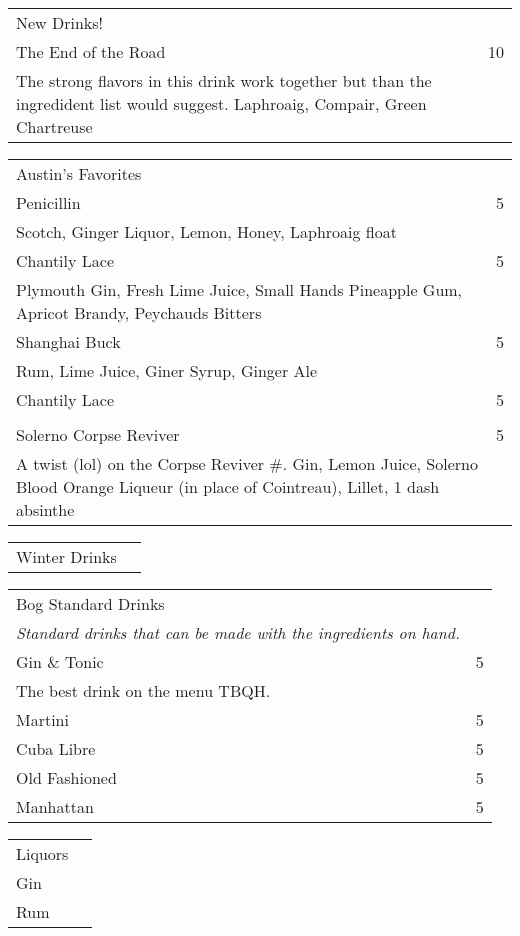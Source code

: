 \documentclass[12pt]{article}
\makeatletter
\newcommand*\ColText[1]{\textcolor{Goldenrod3}{#1}}
\newenvironment{Group}[1]
  {\noindent\begin{tabular*}{\textwidth}{@{}p{.8\linewidth}@{\extracolsep{\fill}}r@{}}
    {\fontsize{24}{29}\selectfont\ColText{#1}}\\[0.8em]}
  {\end{tabular*}}
\newcommand*\Entry[2]{%
  \sffamily#1 & #2}
\newcommand*\Expl[1]{%
  \hspace*{1em}\footnotesize #1}
\makeatother
\begin{document}
\begin{Group}{New Drinks!}
\Entry{The End of the Road}{10} \\
\Expl{The strong flavors in this drink work together but than the ingredident list would suggest. Laphroaig, Compair, Green Chartreuse} \\
\end{Group}

\vfill

\begin{Group}{Austin's Favorites}
\Entry{Penicillin}{5} \\
\Expl{Scotch, Ginger Liquor, Lemon, Honey, Laphroaig float} \\
\Entry{Chantily Lace}{5} \\
\Expl{Plymouth Gin, Fresh Lime Juice, Small Hands Pineapple Gum, Apricot Brandy, Peychauds Bitters} \\
\Entry{Shanghai Buck}{5} \\
\Expl{Rum, Lime Juice, Giner Syrup, Ginger Ale} \\
\Entry{Chantily Lace}{5} \\
\Expl{} \\
\Entry{Solerno Corpse Reviver}{5} \\
\Expl{A twist (lol) on the Corpse Reviver \#. Gin, Lemon Juice, Solerno Blood Orange Liqueur (in place of Cointreau), Lillet, 1 dash absinthe} \\
\end{Group}

\vfill

\begin{Group}{Winter Drinks}
\end{Group}

\vfill

\begin{Group}{Bog Standard Drinks}
\emph{Standard drinks that can be made with the ingredients on hand.} \\
\Entry{Gin \& Tonic}{5} \\
\Entry{The best drink on the menu TBQH.} \\
\Entry{Martini}{5} \\
\Entry{Cuba Libre}{5} \\
\Entry{Old Fashioned}{5} \\
\Entry{Manhattan}{5} \\
\end{Group}

\vfill

\begin{Group}{Liquors}
\Entry{Gin}{} \\
\Entry{Rum}{} \\
\end{Group}
\end{document}
